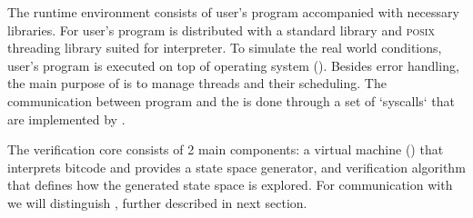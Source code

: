 The runtime environment consists of user's program accompanied with necessary
libraries. For user's program \DIVINE is distributed with a \Cpp{} standard
library and \textsc{posix} threading library suited for \DIVINE interpreter. To
simulate the real world conditions, user's program is executed on top of \DIVINE
operating system (\DIOS). Besides error handling, the main purpose of \DIOS is
to manage threads and their scheduling. The communication between program and
the \DIOS is done through a set of `syscalls` that are implemented by \DIOS.

The verification core consists of 2 main components: a \DIVINE virtual machine
(\DIVM) that interprets \LLVM bitcode and provides a state space generator, and
verification algorithm that defines how the generated state space is
explored. For communication with \DIVM we will distinguish ,
further described in next section.

